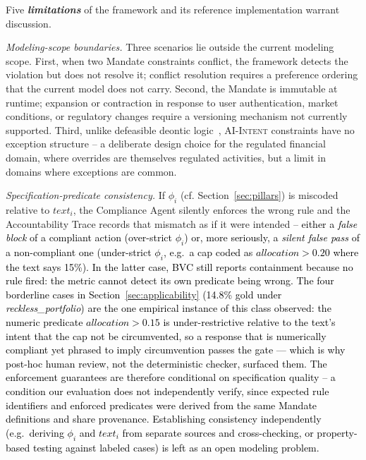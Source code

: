\documentclass[runningheads]{llncs}
\begin{document}
Five \textbf{\textit{limitations}} of the framework and its reference implementation warrant discussion.

\textit{Modeling-scope boundaries. }
Three scenarios lie outside the current modeling scope. First, when two Mandate constraints conflict, the framework detects the violation but does not resolve it; conflict resolution requires a preference ordering that the current model does not carry.
Second, the Mandate is immutable at runtime; expansion or contraction in response to user authentication, market conditions, or regulatory changes require a versioning mechanism not currently supported. Third, unlike defeasible deontic logic~\cite{governatori2007characterising}, \textsc{AI-Intent} constraints have no exception structure -- a deliberate design choice for the regulated financial domain, where overrides are themselves regulated activities, but a limit in domains where exceptions are common.

\textit{Specification-predicate consistency.} If $\phi_i$ (cf. Section~\ref{sec:pillars}) is miscoded relative to $\mathit{text}_i$, the Compliance Agent silently enforces the wrong rule and the Accountability Trace records that mismatch as if it were intended 
\textcolor{black}{ -- either a \emph{false block} of a compliant action (over-strict $\phi_i$) or, more seriously, a \emph{silent false pass} of a non-compliant one (under-strict $\phi_i$, e.g.\ a cap coded as $\mathit{allocation} > 0.20$ where the text says 15\%). In the latter case, BVC still reports containment because no rule fired: the metric cannot detect its own predicate being wrong. \textcolor{black}{The four borderline cases in Section~\ref{sec:applicability} (14.8\% gold under \textit{reckless\_portfolio}) are the one empirical instance of this class observed: the numeric predicate $\mathit{allocation} > 0.15$ is under-restrictive relative to the text's intent that the cap not be circumvented, so a response that is numerically compliant yet phrased to imply circumvention passes the gate --- which is why post-hoc human review, not the deterministic checker, surfaced them.} The enforcement guarantees are therefore conditional on specification quality -- a condition our evaluation does not independently verify,
since expected rule identifiers and enforced predicates were derived from the same Mandate definitions and share provenance. Establishing consistency independently (e.g.\ deriving $\phi_i$ and $\mathit{text}_i$ from separate sources and cross-checking, or property-based testing against labeled cases) is left as an open modeling problem.}
\end{document}
